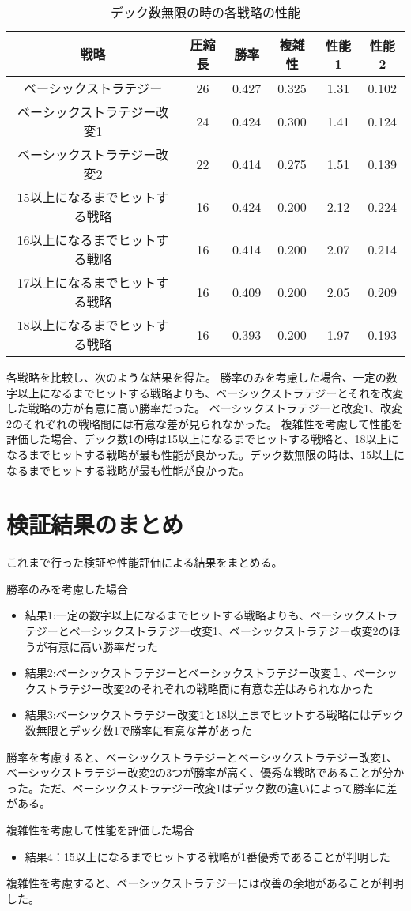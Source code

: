 \begin{table}[H]
\caption{デック数無限の時の各戦略の性能}
\label{table:data_type5}
\begin{center}
\begin{tabular}{|c|c|c|c|c|c|}
\hline
戦略           & 圧縮長 & 勝率    & 複雑性   & 性能1  & 性能2   \\ \hline
ベーシックストラテジー         & 26  & 0.427 & 0.325 & 1.31 & 0.102 \\ \hline
ベーシックストラテジー改変1      & 24  & 0.424 & 0.300  & 1.41 & 0.124 \\ \hline
ベーシックストラテジー改変2      & 22  & 0.414 & 0.275 & 1.51 & 0.139 \\ \hline
15以上になるまでヒットする戦略 & 16  & 0.424 & 0.200 & 2.12 & 0.224 \\ \hline
16以上になるまでヒットする戦略 & 16  & 0.414 & 0.200 & 2.07 & 0.214 \\ \hline
17以上になるまでヒットする戦略 & 16  & 0.409 & 0.200 & 2.05 & 0.209 \\ \hline
18以上になるまでヒットする戦略 & 16  & 0.393 & 0.200 & 1.97 & 0.193 \\ \hline
\end{tabular}
\end{center}
\end{table}

各戦略を比較し、次のような結果を得た。
勝率のみを考慮した場合、一定の数字以上になるまでヒットする戦略よりも、ベーシックストラテジーとそれを改変した戦略の方が有意に高い勝率だった。
ベーシックストラテジーと改変1、改変2のそれぞれの戦略間には有意な差が見られなかった。
複雑性を考慮して性能を評価した場合、デック数1の時は15以上になるまでヒットする戦略と、18以上になるまでヒットする戦略が最も性能が良かった。デック数無限の時は、15以上になるまでヒットする戦略が最も性能が良かった。



\section{検証結果のまとめ}
これまで行った検証や性能評価による結果をまとめる。

勝率のみを考慮した場合
\begin{itemize}
\item 結果1:一定の数字以上になるまでヒットする戦略よりも、ベーシックストラテジーとベーシックストラテジー改変1、ベーシックストラテジー改変2のほうが有意に高い勝率だった
\item 結果2:ベーシックストラテジーとベーシックストラテジー改変１、ベーシックストラテジー改変2のそれぞれの戦略間に有意な差はみられなかった
\item 結果3:ベーシックストラテジー改変1と18以上までヒットする戦略にはデック数無限とデック数1で勝率に有意な差があった
\end{itemize}

勝率を考慮すると、ベーシックストラテジーとベーシックストラテジー改変1、ベーシックストラテジー改変2の3つが勝率が高く、優秀な戦略であることが分かった。ただ、ベーシックストラテジー改変1はデック数の違いによって勝率に差がある。

複雑性を考慮して性能を評価した場合
\begin{itemize}
\item 結果4：15以上になるまでヒットする戦略が1番優秀であることが判明した
\end{itemize}

複雑性を考慮すると、ベーシックストラテジーには改善の余地があることが判明した。
